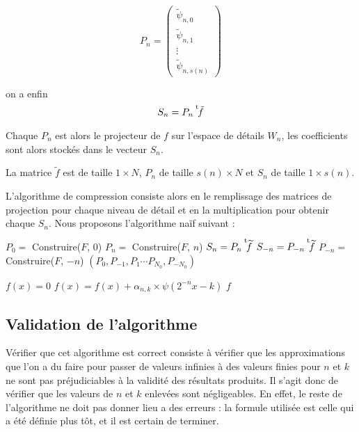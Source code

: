 $$P_n = 
\left(
	\begin{array}{c}
		\widetilde{\psi}_{n, 0} \\
		\widetilde{\psi}_{n, 1} \\
		\vdots \\
		\widetilde{\psi}_{n, s(n)} 
	\end{array}
\right)$$

on a enfin $$S_n = P_n \mskip1mu\prescript{\smash{\mathrm t\mkern-3mu}}{}{\mathstrut\tilde{f} }$$

Chaque $P_n$ est alors le projecteur de $f$ sur l'espace de détails $W_n$, les coefficients sont alors stockés dans le vecteur $S_n$.

\begin{myrem}
	La matrice $\widetilde{f}$ est de taille $1 \times N$, $P_n$ de taille $s(n) \times N$ et $S_n$ de taille $1 \times s(n)$.
\end{myrem}

L'algorithme de compression consiste alors en le remplissage des matrices de projection pour chaque niveau de détail et en la multiplication pour obtenir chaque $S_n$. Nous proposons l'algorithme naïf suivant :

\begin{algorithm}
	\begin{algorithmic}[1]
			\State $P_0 = $ Construire($F$, 0)
				\State $P_n =$ Construire($F$, $n$)
				\State $S_n = P_n  \mskip1mu\prescript{\smash{\mathrm t\mkern-3mu}}{}{\mathstrut\widetilde{f}}$
				\State $S_{-n} = P_{-n} \mskip1mu\prescript{\smash{\mathrm t\mkern-3mu}}{}{\mathstrut\widetilde{f}}$
				\State $P_{-n} =$ Construire($F$, $-n$)
			\EndFor
			\State \Return $(P_0, P_{-1}, P_{1} \cdots P_{N_0}, P_{-N_0})$
		\EndProcedure

		\Statex

		\State $f(x) = 0$
		\State $f(x) = f(x) + \alpha_{n, k} \times \psi(2^{-n} x - k)$
		\EndFor
		\EndFor
		\EndFor
		\State \Return $f$
		\EndProcedure
	\end{algorithmic}
\end{algorithm}

\subsection{Validation de l'algorithme}

Vérifier que cet algorithme est correct consiste à vérifier que les approximations que l'on a du faire pour passer de valeurs infinies à des valeurs finies pour $n$ et $k$ ne sont pas préjudiciables à la validité des résultats produits. Il s'agit donc de vérifier que les valeurs de $n$ et $k$ enlevées sont négligeables. En effet,  le reste de l'algorithme ne doit pas donner lieu a des erreurs : la formule utilisée est celle qui a été définie plus tôt, et il est certain de terminer. 

